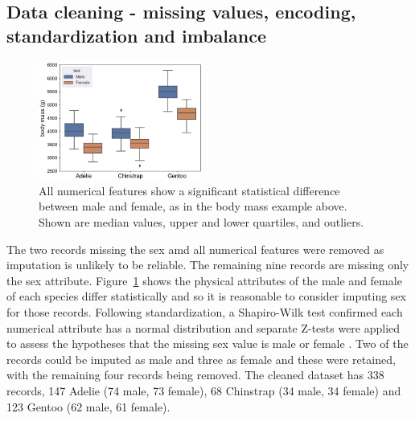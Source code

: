 \documentclass[a4paper, 11pt]{article}
\begin{document}
\vspace{\baselineskip}
\subsection*{Data cleaning - missing values, encoding, standardization and imbalance}

\begin{figure} %
  \centering
  \vspace{-1.2\baselineskip} %
  \includegraphics[width=0.48\textwidth]{sex.png} %
  \vspace{-0.5\baselineskip} %
  \caption{\centering\linespread{0.8}\selectfont All numerical features show a significant statistical difference between male and female, 
  as in the body mass example above. Shown are median values, upper and lower quartiles, 
  and outliers.}
  \vspace{-0.5\baselineskip} %
  \label{fig:sex}
\end{figure}   

The two records missing the sex amd all numerical features were removed as imputation is unlikely to be reliable. 
The remaining nine records are missing only the sex attribute. Figure~\ref{fig:sex} shows the physical 
attributes of the male and female of each species differ statistically and so it is reasonable to 
consider imputing sex for those records. Following standardization, 
a Shapiro-Wilk test confirmed each numerical attribute has a normal distribution \cite{shapiro1965analysis} 
and separate Z-tests were applied to assess the 
hypotheses that the missing sex value is male or female \cite{freedman2007statistics}. 
Two of the records could be imputed as male and three as female 
and these were retained, with the remaining four records being removed. 
The cleaned dataset has 338 records, 147 Adelie  
(74 male, 73 female), 68 Chinstrap (34 male, 34 female) and 123 Gentoo (62 male, 61 female).
\end{document}
